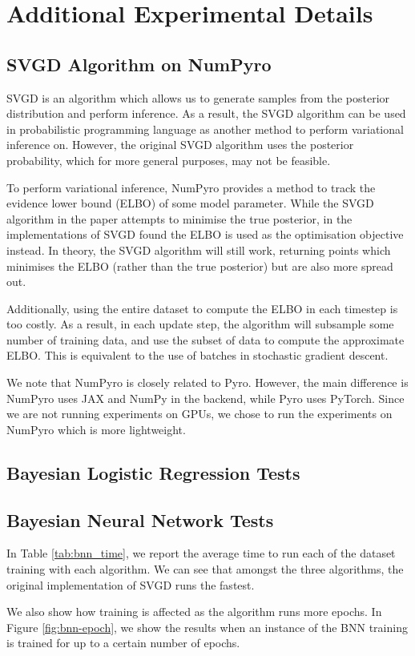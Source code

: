 \section{Additional Experimental Details}

\subsection{SVGD Algorithm on NumPyro}
\label{ssect:svgd-npy}

SVGD is an algorithm which allows us to generate samples from the posterior distribution and perform inference. As a result, the SVGD algorithm can be used in probabilistic programming language as another method to perform variational inference on. However, the original SVGD algorithm uses the posterior probability, which for more general purposes, may not be feasible. 

To perform variational inference, NumPyro provides a method to track the evidence lower bound (ELBO) of some model parameter. While the SVGD algorithm in the paper attempts to minimise the true posterior, in the implementations of SVGD found the ELBO is used as the optimisation objective instead. In theory, the SVGD algorithm will still work, returning points which minimises the ELBO (rather than the true posterior) but are also more spread out. 

Additionally, using the entire dataset to compute the ELBO in each timestep is too costly. As a result, in each update step, the algorithm will subsample some number of training data, and use the subset of data to compute the approximate ELBO. This is equivalent to the use of batches in stochastic gradient descent.

We note that NumPyro is closely related to Pyro. However, the main difference is NumPyro uses JAX and NumPy in the backend, while Pyro uses PyTorch. Since we are not running experiments on GPUs, we chose to run the experiments on NumPyro which is more lightweight.

\subsection{Bayesian Logistic Regression Tests}



\subsection{Bayesian Neural Network Tests}\label{ssect:bnn-time}

In Table \ref{tab:bnn_time}, we report the average time to run each of the dataset training with each algorithm. We can see that amongst the three algorithms, the original implementation of SVGD runs the fastest.



\label{ssect:bnn-epoch}

We also show how training is affected as the algorithm runs more epochs. In Figure \ref{fig:bnn-epoch}, we show the results when an instance of the BNN training is trained for up to a certain number of epochs. 

